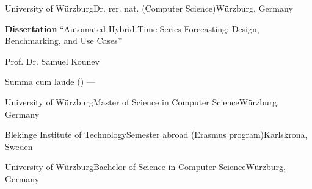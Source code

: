 
\begin{cventries}


	{University of Würzburg}{Dr. rer. nat. (Computer Science)}{Würzburg, Germany}%
	{}%
	{
		\begin{cvitems} %
			\item {\textbf{Dissertation} ``Automated Hybrid Time Series Forecasting: Design, Benchmarking, and Use Cases''}
			\item {\textbf{} Prof. Dr. Samuel Kounev}
			\item {\textbf{} Summa cum laude () --- }
		\end{cvitems}
	}

	{University of Würzburg}{Master of Science in Computer Science}{Würzburg, Germany}%
	{}%
    {
	}

	{Blekinge Institute of Technology}{Semester abroad (Erasmus program)}{Karlskrona, Sweden}%
    {}%
    {}

	{University of Würzburg}{Bachelor of Science in Computer Science}{Würzburg, Germany}%
    {}%
    {
	}



\end{cventries}